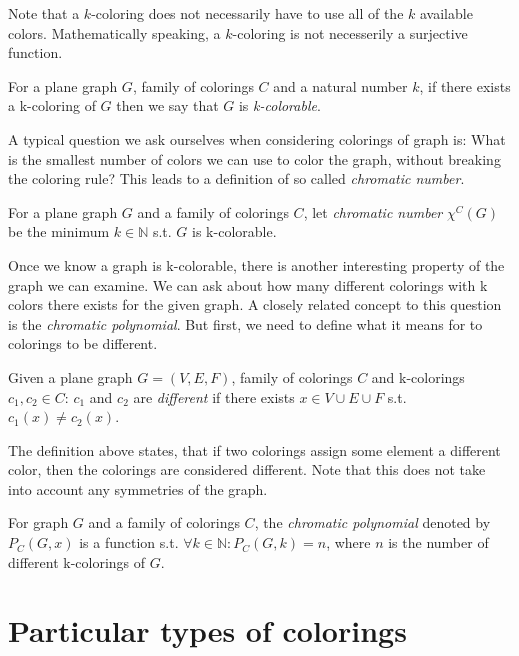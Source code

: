 Note that a $k$-coloring does not necessarily have to use all of the $k$ available colors. Mathematically speaking, a $k$-coloring is not necesserily a surjective function.

\begin{defn}
    For a plane graph $G$, family of colorings $C$ and a natural number $k$, if there exists a k-coloring of $G$ then we say that $G$ is \emph{k-colorable}.
\end{defn}

A typical question we ask ourselves when considering colorings of graph is: What is the smallest number of colors we can use to color the graph, without breaking the coloring rule? This leads to a definition of so called \textit{chromatic number}. 


\begin{defn}
    For a plane graph $G$ and a family of colorings $C$, let \emph{chromatic number} $\chi ^C (G)$ be the minimum $k \in \mathbb{N}$ s.t. $G$ is k-colorable.
\end{defn}

Once we know a graph is k-colorable, there is another interesting property of the graph we can examine. We can ask about how many different colorings with k colors there exists for the given graph. A closely related concept to this question is the \emph{chromatic polynomial}. But first, we need to define what it means for to colorings to be different.

\begin{defn}
    Given a plane graph $G=(V,E,F)$, family of colorings $C$ and k-colorings $c_1,c_2 \in C$: $c_1$ and $c_2$ are \emph{different} if there exists $x \in V \cup E \cup F$ s.t. $c_1(x) \neq c_2(x)$.
\end{defn}

The definition above states, that if two colorings assign some element a different color, then the colorings are considered different. Note that this does not take into account any symmetries of the graph.

\begin{defn}
    For graph $G$ and a family of colorings $C$, the \emph{chromatic polynomial} denoted by $P_{C}(G,x)$ is a function s.t. $\forall k \in \mathbb{N} : P_C(G,k) = n$, where $n$ is the number of different k-colorings of $G$.
\end{defn}

\section{Particular types of colorings}

